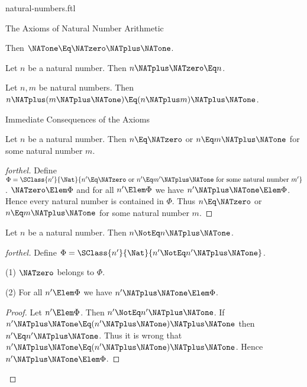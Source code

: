 \documentclass{stex}
\begin{document}
\begin{smodule}{natural-numbers.ftl}
\begin{sfragment}{The Axioms of Natural Number Arithmetic}
  \begin{axiom}[forthel]
    Then $\NATone \Eq \NATzero \NATplus \NATone$.
  \end{axiom}

  \begin{axiom}[forthel]
    Let $n$ be a natural number.
    Then $n \NATplus \NATzero \Eq n$.
  \end{axiom}

  \begin{axiom}[forthel]
    Let $n, m$ be natural numbers.
    Then $n \NATplus (m \NATplus \NATone) \Eq (n \NATplus m) \NATplus \NATone$.
  \end{axiom}
\end{sfragment}

\begin{sfragment}{Immediate Consequences of the Axioms}
  \begin{proposition}[forthel]
    Let $n$ be a natural number.
    Then $n \Eq \NATzero$ or $n \Eq m \NATplus \NATone$ for some natural number $m$.
  \end{proposition}
  \begin{proof}[forthel]
    Define $\Phi = \SClass{n'}{\Nat}{n' \Eq \NATzero\text{ or }n' \Eq m' \NATplus \NATone\text{ for some natural number }m'}$.
    $\NATzero \Elem \Phi$ and for all $n' \Elem  \Phi$ we have $n' \NATplus \NATone \Elem \Phi$.
    Hence every natural number is contained in $\Phi$.
    Thus $n \Eq \NATzero$ or $n \Eq m \NATplus \NATone$ for some natural number $m$.
  \end{proof}

  \begin{proposition}[forthel]
    Let $n$ be a natural number.
    Then $n \NotEq n \NATplus \NATone$.
  \end{proposition}
  \begin{proof}[forthel]
    Define $\Phi = \SClass{n'}{\Nat}{n' \NotEq n' \NATplus \NATone}$.

    (1) $\NATzero$ belongs to $\Phi$.

    (2) For all $n' \Elem \Phi$ we have $n' \NATplus \NATone \Elem \Phi$.
    \begin{proof}
      Let $n' \Elem \Phi$.
      Then $n' \NotEq n' \NATplus \NATone$.
      If $n' \NATplus \NATone \Eq (n' \NATplus \NATone) \NATplus \NATone$ then $n' \Eq n' \NATplus \NATone$.
      Thus it is wrong that $n' \NATplus \NATone \Eq (n' \NATplus \NATone) \NATplus \NATone$.
      Hence $n' \NATplus \NATone \Elem \Phi$.
    \end{proof}


\end{proof}
\end{sfragment}
\end{smodule}
\end{document}
